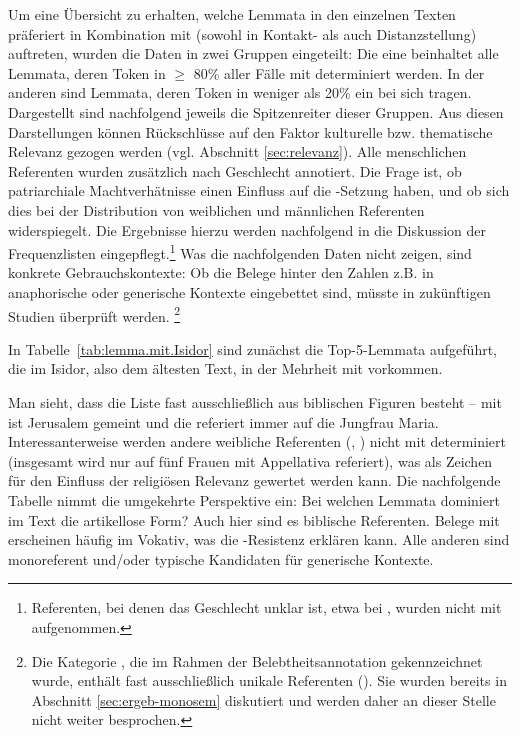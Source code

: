 Um eine Übersicht zu erhalten, welche Lemmata in den einzelnen Texten präferiert in Kombination mit  (sowohl in Kontakt- als auch Distanzstellung) auftreten, wurden die Daten in zwei Gruppen eingeteilt: Die eine beinhaltet alle Lemmata, deren Token in $\geq$ 80\% aller Fälle  mit  determiniert werden. In der anderen sind Lemmata, deren Token in weniger als 20\%  ein  bei sich tragen. Dargestellt sind nachfolgend jeweils die Spitzenreiter dieser Gruppen. Aus diesen Darstellungen können Rückschlüsse auf den Faktor kulturelle bzw. thematische Relevanz gezogen werden (vgl. Abschnitt \ref{sec:relevanz}). Alle menschlichen Referenten wurden zusätzlich nach Geschlecht annotiert. Die Frage ist, ob patriarchiale Machtverhätnisse  einen Einfluss auf die -Setzung haben, und ob sich dies bei der Distribution von weiblichen und männlichen Referenten widerspiegelt. Die Ergebnisse hierzu werden nachfolgend in die Diskussion der Frequenzlisten eingepflegt.\footnote{Referenten, bei denen das Geschlecht unklar ist, etwa bei , wurden nicht mit aufgenommen.} Was die nachfolgenden Daten nicht zeigen, sind konkrete Gebrauchskontexte: Ob die Belege hinter den Zahlen z.B. in anaphorische oder generische Kontexte eingebettet sind, müsste in zukünftigen Studien überprüft werden. \footnote{Die Kategorie , die im Rahmen der Belebtheitsannotation gekennzeichnet wurde, enthält fast ausschließlich unikale Referenten (). Sie wurden bereits in Abschnitt \ref{sec:ergeb-monosem} diskutiert und werden daher an dieser Stelle nicht weiter besprochen.} 

In Tabelle~\ref {tab:lemma.mit.Isidor} sind zunächst die Top-5-Lemmata aufgeführt, die im Isidor, also dem ältesten Text, in der Mehrheit mit  vorkommen. 


Man sieht, dass die Liste fast ausschließlich aus biblischen Figuren besteht -- mit  ist Jerusalem gemeint und die  referiert immer auf die Jungfrau Maria. Interessanterweise werden andere weibliche Referenten (, ) nicht mit  determiniert (insgesamt wird nur auf fünf Frauen mit Appellativa referiert), was als Zeichen für den Einfluss der religiösen Relevanz gewertet werden kann. 
Die nachfolgende Tabelle nimmt die umgekehrte Perspektive ein: Bei welchen Lemmata dominiert im Text die artikellose Form? Auch hier sind es biblische Referenten. Belege mit  erscheinen häufig im Vokativ, was die -Resistenz erklären kann. Alle anderen sind monoreferent und/oder typische Kandidaten für generische Kontexte.

